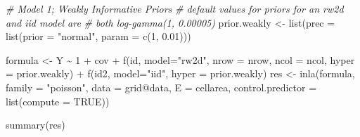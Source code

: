 \documentclass[
]{article}
\newenvironment{Shaded}{\begin{snugshade}}{\end{snugshade}}
\newcommand{\AttributeTok}[1]{\textcolor[rgb]{0.77,0.63,0.00}{#1}}
\newcommand{\CommentTok}[1]{\textcolor[rgb]{0.56,0.35,0.01}{\textit{#1}}}
\newcommand{\ConstantTok}[1]{\textcolor[rgb]{0.00,0.00,0.00}{#1}}
\newcommand{\DecValTok}[1]{\textcolor[rgb]{0.00,0.00,0.81}{#1}}
\newcommand{\FloatTok}[1]{\textcolor[rgb]{0.00,0.00,0.81}{#1}}
\newcommand{\FunctionTok}[1]{\textcolor[rgb]{0.00,0.00,0.00}{#1}}
\newcommand{\NormalTok}[1]{#1}
\newcommand{\OtherTok}[1]{\textcolor[rgb]{0.56,0.35,0.01}{#1}}
\newcommand{\SpecialCharTok}[1]{\textcolor[rgb]{0.00,0.00,0.00}{#1}}
\newcommand{\StringTok}[1]{\textcolor[rgb]{0.31,0.60,0.02}{#1}}
\begin{document}
\begin{Shaded}
\begin{Highlighting}[]
\CommentTok{\# Model 1; Weakly Informative Priors}
\CommentTok{\# default values for priors for an rw2d and iid model are }
\CommentTok{\# both log{-}gamma(1, 0.00005)}
\NormalTok{prior.weakly }\OtherTok{\textless{}{-}} \FunctionTok{list}\NormalTok{(}\AttributeTok{prec =} \FunctionTok{list}\NormalTok{(}\AttributeTok{prior =} \StringTok{"normal"}\NormalTok{,}
                               \AttributeTok{param =} \FunctionTok{c}\NormalTok{(}\DecValTok{1}\NormalTok{, }\FloatTok{0.01}\NormalTok{)))}

\NormalTok{formula }\OtherTok{\textless{}{-}}\NormalTok{ Y }\SpecialCharTok{\textasciitilde{}} \DecValTok{1} \SpecialCharTok{+}\NormalTok{ cov }\SpecialCharTok{+}
  \FunctionTok{f}\NormalTok{(id, }\AttributeTok{model=}\StringTok{"rw2d"}\NormalTok{, }\AttributeTok{nrow =}\NormalTok{ nrow, }\AttributeTok{ncol =}\NormalTok{ ncol, }\AttributeTok{hyper =}\NormalTok{ prior.weakly) }\SpecialCharTok{+}
  \FunctionTok{f}\NormalTok{(id2, }\AttributeTok{model=}\StringTok{"iid"}\NormalTok{, }\AttributeTok{hyper =}\NormalTok{ prior.weakly)}
\NormalTok{res }\OtherTok{\textless{}{-}} \FunctionTok{inla}\NormalTok{(formula, }\AttributeTok{family =} \StringTok{"poisson"}\NormalTok{, }\AttributeTok{data =}\NormalTok{ grid}\SpecialCharTok{@}\NormalTok{data,}
    \AttributeTok{E =}\NormalTok{ cellarea, }\AttributeTok{control.predictor =} \FunctionTok{list}\NormalTok{(}\AttributeTok{compute =} \ConstantTok{TRUE}\NormalTok{))}

\FunctionTok{summary}\NormalTok{(res)}
\end{Highlighting}
\end{Shaded}
\end{document}
